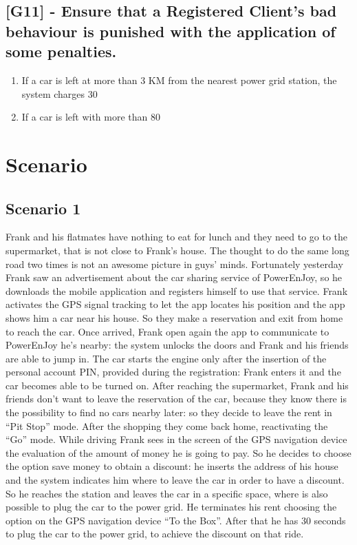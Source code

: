 \subsection{[G11] - Ensure that a Registered Client’s bad behaviour is punished with the application of some penalties.}
\begin{enumerate}[label=R11.\arabic*]
\item If a car is left at more than 3 KM from the nearest power grid station, the system charges 30%
\item If a car is left with more than 80%
\end{enumerate}
\section{Scenario}
\subsection{Scenario 1}
Frank and his flatmates have nothing to eat for lunch and they need to go to the supermarket, that is not close to Frank’s house.
The thought to do the same long road two times is not an awesome picture in guys’ minds.
Fortunately yesterday Frank saw an advertisement about the car sharing service of PowerEnJoy, so he downloads the mobile application and registers himself to use that service.
Frank activates the GPS signal tracking to let the app locates his position and the app shows him a car near his house.
So they make a reservation and exit from home to reach the car.
Once arrived, Frank open again the app to communicate to PowerEnJoy he’s nearby: the system unlocks the doors and Frank and his friends are able to jump in.
The car starts the engine only after the insertion of the personal account PIN, provided during the registration: Frank enters it and the car becomes able to be turned on.
After reaching the supermarket, Frank and his friends don’t want to leave the reservation of the car, because they know there is the possibility to find no cars nearby later: so they decide to leave the rent in “Pit Stop” mode.
After the shopping they come back home, reactivating the “Go” mode.
While driving Frank sees in the screen of the GPS navigation device the evaluation of the amount of money he is going to pay.
So he decides to choose the option save money to obtain a discount: he inserts the address of his house and the system indicates him where to leave the car in order to have a discount.
So he reaches the station and leaves the car in a specific space, where is also possible to plug the car to the power grid.
He terminates his rent choosing the option on the GPS navigation device  “To the Box”.
After that he has 30 seconds to plug the car to the power grid, to achieve the discount on that ride.

